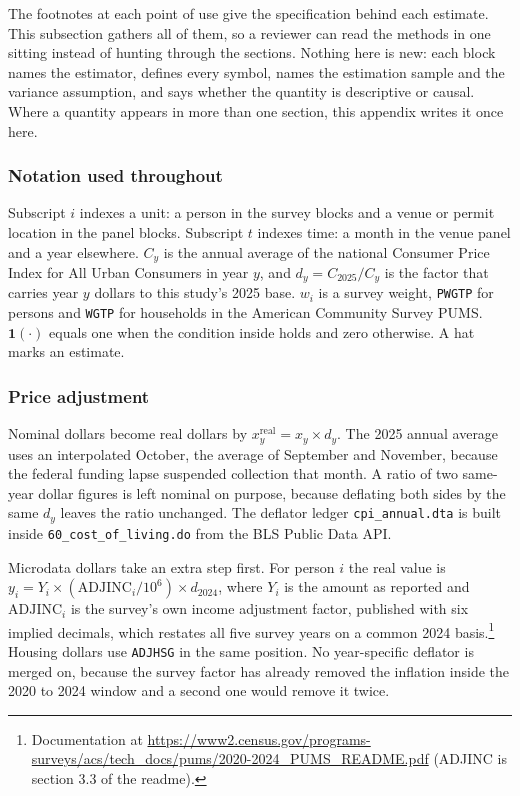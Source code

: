 The footnotes at each point of use give the specification behind each
estimate. This subsection gathers all of them, so a reviewer can read the
methods in one sitting instead of hunting through the sections. Nothing here
is new: each block names the estimator, defines every symbol, names the
estimation sample and the variance assumption, and says whether the quantity
is descriptive or causal. Where a quantity appears in more than one section,
this appendix writes it once here.

\subsubsection*{Notation used throughout}

Subscript \(i\) indexes a unit: a person in the survey blocks and a venue or
permit location in the panel blocks. Subscript \(t\) indexes time: a month in
the venue panel and a year elsewhere. \(C_y\) is the annual average of the
national Consumer Price Index for All Urban Consumers in year \(y\), and
\(d_y = C_{2025}/C_y\) is the factor that carries year \(y\) dollars to this
study's 2025 base. \(w_i\) is a survey weight, \texttt{PWGTP} for persons and
\texttt{WGTP} for households in the American Community Survey PUMS.
\(\mathbf{1}(\cdot)\) equals one when the condition inside holds and zero
otherwise. A hat marks an estimate.

\subsubsection*{Price adjustment}

Nominal dollars become real dollars by \(x^{\mathrm{real}}_y = x_y \times
d_y\). The 2025 annual average uses an interpolated October, the average of
September and November, because the federal funding lapse suspended
collection that month. A ratio of two same-year dollar figures is left
nominal on purpose, because deflating both sides by the same \(d_y\) leaves
the ratio unchanged. The deflator ledger \texttt{cpi\_annual.dta} is built
inside \texttt{60\_cost\_of\_living.do} from the BLS Public Data API.

Microdata dollars take an extra step first. For person \(i\) the real value
is \(y_i = Y_i \times (\mathrm{ADJINC}_i/10^{6}) \times d_{2024}\), where
\(Y_i\) is the amount as reported and \(\mathrm{ADJINC}_i\) is the survey's
own income adjustment factor, published with six implied decimals, which
restates all five survey years on a common 2024
basis.\footnote{Documentation at
\url{https://www2.census.gov/programs-surveys/acs/tech_docs/pums/2020-2024_PUMS_README.pdf}
(ADJINC is section 3.3 of the readme).} Housing dollars use
\texttt{ADJHSG} in the same position. No year-specific deflator is merged
on, because the survey factor has already removed the inflation inside the
2020 to 2024 window and a second one would remove it twice.

